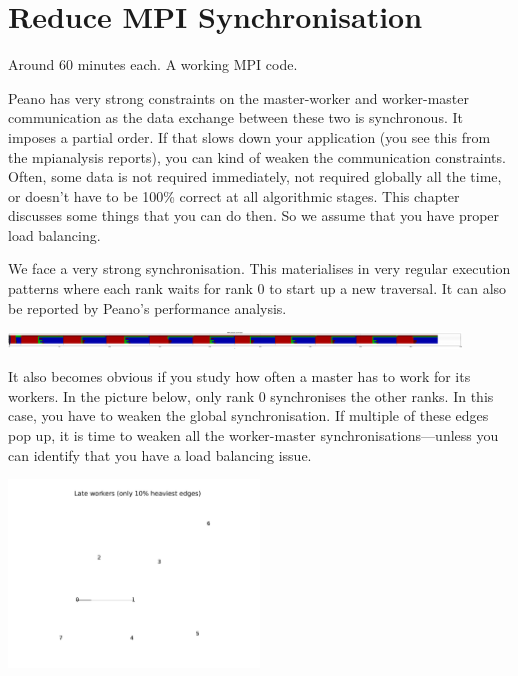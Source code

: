 \section{Reduce MPI Synchronisation}


\chapterDescription
  {
    Around 60 minutes each.
  }
  {
    A working MPI code.
  }


Peano has very strong constraints on the master-worker and worker-master
communication as the data exchange between these two is synchronous. It imposes
a partial order. If that slows down your application (you see this from the
mpianalysis reports), you can kind of weaken the communication constraints. 
Often, some data is not required immediately, not required globally all the
time, or doesn't have to be 100\% correct at all algorithmic stages. This
chapter discusses some things that you can do then.
So we assume that you have proper load balancing.


\begin{smell}
We face a very strong synchronisation.
This materialises in very regular execution patterns
where each rank waits for rank 0 to start up a new traversal.
It can also be reported by Peano's performance analysis.
\end{smell}

\begin{center}
  \includegraphics[width=0.9\textwidth]{63_mpi-synchronisation/mpi-phases-before.pdf}
\end{center}

\noindent
It also becomes obvious if you study how often a master has to work for its 
workers. 
In the picture below, only rank 0 synchronises the other ranks.
In this case, you have to weaken the global synchronisation.
If multiple of these edges pop up, it is time to weaken all the worker-master
synchronisations---unless you can identify that you have a load balancing issue.


\begin{center}
  \includegraphics[width=0.5\textwidth]{63_mpi-synchronisation/master-worker-before.pdf}
\end{center}



